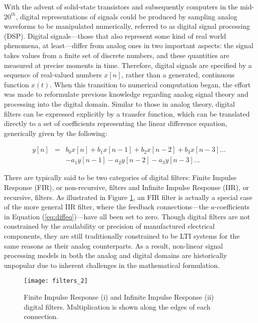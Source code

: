 With the advent of solid-state transistors and subsequently computers in the mid-$20^{th}$, digital representations of signals could be produced by sampling analog waveforms to be manipulated numerically, referred to as digital signal processing (DSP).
Digital signals---those that also represent some kind of real world phenomena, at least---differ from analog ones in two important aspects: the signal takes values from a finite set of discrete numbers, and these quantities are measured at precise moments in time.
Therefore, digital signals are specified by a sequence of real-valued numbers $x[n]$, rather than a generated, continuous function $x(t)$.
When this transition to numerical computation began, the effort was made to reformulate previous knowledge regarding analog signal theory and processing into the digital domain.
Similar to those in analog theory, digital filters can be expressed explicitly by a transfer function, which can be translated directly to a set of coefficients representing the linear difference equation, generically given by the following:

\begin{equation}
\label{eq:diffeq}
\begin{array}{rcr}
y[n] & = & b_0x[n] + b_1x[n-1] + b_2x[n-2] + b_3x[n-3] \ldots \\
 & & - a_1y[n-1] - a_2y[n-2] - a_3y[n-3] \ldots
\end{array}
\end{equation}

There are typically said to be two categories of digital filters: Finite Impulse Response (FIR), or non-recursive, filters and Infinite Impulse Response (IIR), or recursive, filters.
As illustrated in Figure \ref{fig:filters}, an FIR filter is actually a special case of the more general IIR filter, where the feedback connections---the $a$-coefficients in Equation (\ref{eq:diffeq})---have all been set to zero.
Though digital filters are not constrained by the availability or precision of manufactured electrical components, they are still traditionally constrained to be LTI systems for the same reasons as their analog counterparts.
As a result, non-linear signal processing models in both the analog and digital domains are historically unpopular due to inherent challenges in the mathematical formulation.

\begin{figure}[!t]
\centering
\texttt{[image: filters\_2]}
\caption{\small{Finite Impulse Response (i) and Infinite Impulse Response (ii) digital filters. Multiplication is shown along the edges of each connection.}}
\label{fig:filters}
\end{figure}

